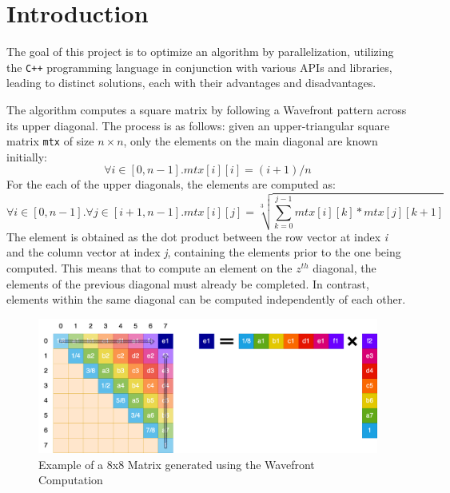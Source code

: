 \section*{Introduction}
The goal of this project is to optimize an algorithm by parallelization, utilizing the \texttt{C++} programming language in conjunction with various APIs and libraries, leading to distinct solutions, each with their advantages and disadvantages.
\par The algorithm computes a square matrix by following a Wavefront pattern across its upper diagonal. The process is as follows: given an upper-triangular square matrix \texttt{mtx} of size $n \times n$, only the elements on the main diagonal are known initially:
\begin{equation}
    \forall i \in [0, n - 1].mtx[i][i] = (i+1)/n  
\end{equation}
For the each of the upper diagonals, the elements are computed as:
\begin{equation}
    \forall i \in [0, n - 1]. \forall j \in [i + 1, n - 1]. mtx[i][j] = \sqrt[3]{\sum_{k = 0}^{j - 1}mtx[i][k] * mtx[j][k + 1]}
\end{equation}
The element is obtained as the dot product between the row vector at index \textit{i} and the column vector at index \textit{j}, containing the elements prior to the one being computed. This means that to compute an element on the $\textit{z}^{th}$ diagonal, the elements of the previous diagonal must already be completed. In contrast, elements within the same diagonal can be computed independently of each other.

\begin{figure}[h]
    \centering\includegraphics[scale=0.25]{img/Introduction/WaveFrontExample.png}
    
    \caption{Example of a 8x8 Matrix generated using the Wavefront Computation}
\end{figure}
